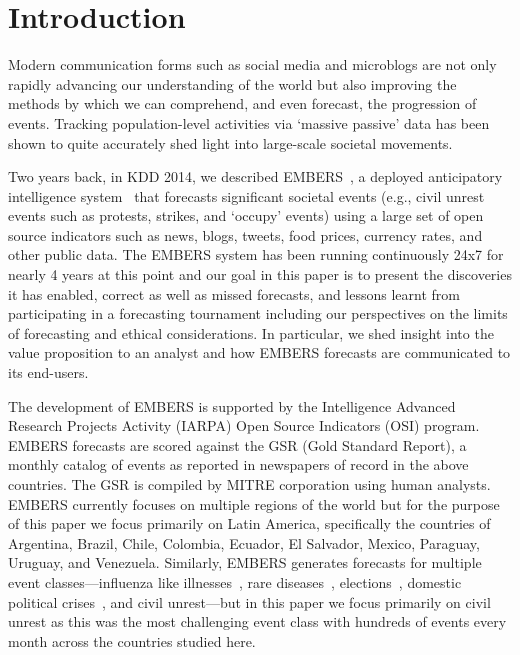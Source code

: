 \section{Introduction}
Modern communication forms such as social media and microblogs are not only rapidly
advancing our understanding of the world but also improving the methods by which we can
comprehend, and even forecast, the progression of events.
Tracking population-level activities via `massive passive' data has been shown to
quite accurately shed light into large-scale societal movements.

Two years back, in KDD 2014, we described EMBERS~\cite{kdd:beating-the-news}, a deployed anticipatory
intelligence system~\cite{bigdata-andy-doyle-embers-paper} that forecasts significant
societal events (e.g., civil unrest
events such as protests, strikes, and `occupy' events) using a large set of open source
indicators such as news, blogs, tweets, food prices, currency rates, and other public
data. The EMBERS system has been running continuously 24x7 for nearly 4 years at this point
and our goal in this paper is to present the discoveries it has enabled,
correct as well as missed
forecasts, and lessons learnt from participating in a forecasting tournament including
our perspectives on the limits of forecasting and ethical considerations. In
particular, we shed insight into the value proposition to an analyst and how EMBERS forecasts
are communicated to its end-users.

The development of EMBERS is supported by the Intelligence Advanced Research Projects
Activity (IARPA) Open Source Indicators (OSI) program.
EMBERS forecasts are scored against the GSR (Gold Standard Report), a monthly catalog of
events as reported in newspapers of record in the above countries. The GSR is compiled by MITRE corporation
using human analysts.
EMBERS currently focuses on multiple regions of the world but for the purpose of this paper
we focus primarily on Latin America, specifically the countries of
Argentina, Brazil, Chile, Colombia, Ecuador, El Salvador, Mexico, Paraguay, Uruguay, and Venezuela.
Similarly, EMBERS generates forecasts for multiple event classes---influenza like illnesses~\cite{prithwish-ili},
rare diseases~\cite{sdm-saurav}, elections~\cite{aravindan-wei-besc}, domestic political crises~\cite{gdelt-acm-webscience}, and civil unrest---but in this paper we focus primarily on civil unrest as this was the
most challenging event class with hundreds of events every month across the countries studied here.

